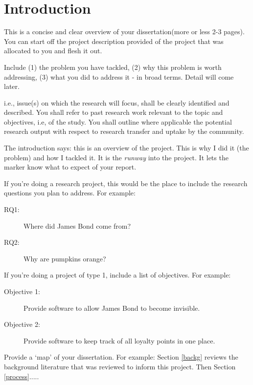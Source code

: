 \section{Introduction}


This is a concise and clear overview of your dissertation(more or less 2-3 pages). You can start off the project description provided of the project that was allocated to you and flesh it out.

Include (1) the problem you have tackled, (2) why this problem is worth addressing, (3) what you did to address it - in broad terms. Detail will come later.



i.e., issue(s) on which the research will focus, shall be clearly identified and described. You shall refer to past research work relevant to the topic and objectives, i.e, of the study. You shall outline where applicable the potential research output with respect to research transfer and uptake by the community.

The introduction says: this is an overview of the project. This is why I did it (the problem) and how I tackled it. It is the \emph{runway} into the project. It lets the marker know what to expect of your report.

If you're doing a research project, this would be the place to include the research questions you plan to address. For example:

\begin{description}
\item [RQ1:] Where did James Bond come from?

\item [RQ2:] Why are pumpkins orange?
\end{description}

If you're doing a project of type 1, include a list of objectives. For example:
\begin{description}
\item [Objective 1:] Provide software to allow James Bond to become invisible.

\item [Objective 2:] Provide software to keep track of all loyalty points in one place.
\end{description}

Provide a `map' of your dissertation. For example: Section \ref{backg} reviews the background literature that was reviewed to inform this project. Then Section \ref{process}.....
